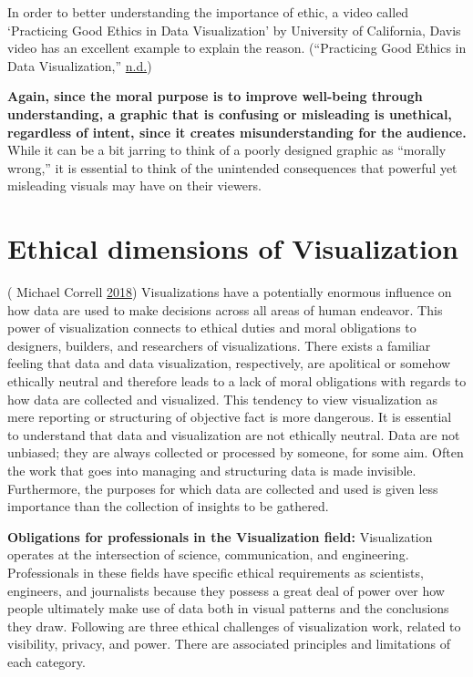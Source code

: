\documentclass[]{book}
\begin{document}
In order to better understanding the importance of ethic, a video called `Practicing Good Ethics in Data Visualization' by University of California, Davis video has an excellent example to explain the reason. (``Practicing Good Ethics in Data Visualization,'' \protect\hyperlink{ref-Practicing_Good_Ethics_in_Data_Visualization}{n.d.})

\textbf{Again, since the moral purpose is to improve well-being through understanding, a graphic that is confusing or misleading is unethical, regardless of intent, since it creates misunderstanding for the audience.} While it can be a bit jarring to think of a poorly designed graphic as ``morally wrong,'' it is essential to think of the unintended consequences that powerful yet misleading visuals may have on their viewers.

\hypertarget{ethical-dimensions-of-visualization}{%
\section{Ethical dimensions of Visualization}\label{ethical-dimensions-of-visualization}}

( Michael Correll \protect\hyperlink{ref-ethical_dim}{2018})
Visualizations have a potentially enormous influence on how data are used to make decisions across all areas of human endeavor. This power of visualization connects to ethical duties and moral obligations to designers, builders, and researchers of visualizations.
There exists a familiar feeling that data and data visualization, respectively, are apolitical or somehow ethically neutral and therefore leads to a lack of moral obligations with regards to how data are collected and visualized. This tendency to view visualization as mere reporting or structuring of objective fact is more dangerous. It is essential to understand that data and visualization are not ethically neutral. Data are not unbiased; they are always collected or processed by someone, for some aim. Often the work that goes into managing and structuring data is made invisible. Furthermore, the purposes for which data are collected and used is given less importance than the collection of insights to be gathered.

\textbf{Obligations for professionals in the Visualization field:}
Visualization operates at the intersection of science, communication, and engineering. Professionals in these fields have specific ethical requirements as scientists, engineers, and journalists because they possess a great deal of power over how people ultimately make use of data both in visual patterns and the conclusions they draw. Following are three ethical challenges of visualization work, related to visibility, privacy, and power. There are associated principles and limitations of each category.
\end{document}
